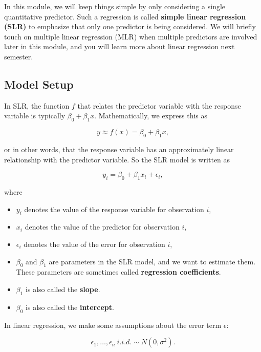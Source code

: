 \documentclass[
]{book}
\providecommand{\tightlist}{%
  \setlength{\itemsep}{0pt}\setlength{\parskip}{0pt}}
\begin{document}
In this module, we will keep things simple by only considering a single quantitative predictor. Such a regression is called \textbf{simple linear regression (SLR)} to emphasize that only one predictor is being considered. We will briefly touch on multiple linear regression (MLR) when multiple predictors are involved later in this module, and you will learn more about linear regression next semester.

\subsection{Model Setup}\label{model-setup}

In SLR, the function \(f\) that relates the predictor variable with the response variable is typically \(\beta_0 + \beta_1 x\). Mathematically, we express this as

\[
y \approx f(x) = \beta_0 + \beta_1 x,
\]

or in other words, that the response variable has an approximately linear relationship with the predictor variable. So the SLR model is written as

\begin{equation} 
y_i=\beta_0+\beta_{1}x_i + \epsilon_i,
\label{eq:10-SLRmod}
\end{equation}

where

\begin{itemize}
\tightlist
\item
  \(y_i\) denotes the value of the response variable for observation \(i\),
\item
  \(x_i\) denotes the value of the predictor for observation \(i\),
\item
  \(\epsilon_i\) denotes the value of the error for observation \(i\),
\item
  \(\beta_0\) and \(\beta_1\) are parameters in the SLR model, and we want to estimate them. These parameters are sometimes called \textbf{regression coefficients}.
\item
  \(\beta_1\) is also called the \textbf{slope}.
\item
  \(\beta_0\) is also called the \textbf{intercept}.
\end{itemize}

In linear regression, we make some assumptions about the error term \(\epsilon\):

\begin{equation} 
\epsilon_1,\ldots,\epsilon_n \ i.i.d. \sim N(0,\sigma^2).
\label{eq:10-assumptions}
\end{equation}
\end{document}

